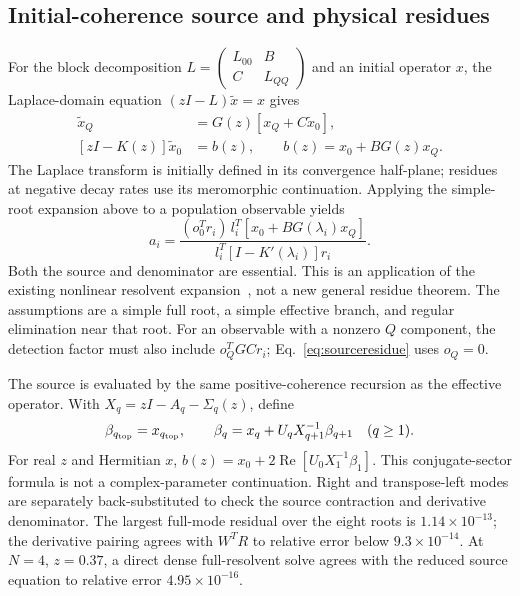 \documentclass[aps,pra,10pt,onecolumn,superscriptaddress,amsmath,amssymb]{revtex4-2}
\begin{document}
\subsection{Initial-coherence source and physical residues}
For the block decomposition $L=\left(\begin{smallmatrix}L_{00}&B\\C&L_{QQ}\end{smallmatrix}\right)$ and an initial operator $x$, the Laplace-domain equation $(zI-L)\widetilde x=x$ gives
\begin{align}
 \widetilde x_Q&=G(z)[x_Q+C\widetilde x_0],\\
 [zI-K(z)]\widetilde x_0&=b(z),\qquad b(z)=x_0+BG(z)x_Q.
\end{align}
The Laplace transform is initially defined in its convergence half-plane; residues at negative decay rates use its meromorphic continuation. Applying the simple-root expansion above to a population observable yields
\begin{equation}
 a_i=\frac{(o_0^Tr_i)\,l_i^T[x_0+BG(\lambda_i)x_Q]}
 {l_i^T[I-K'(\lambda_i)]r_i}.
 \label{eq:sourceresidue}
\end{equation}
Both the source and denominator are essential. This is an application of the existing nonlinear resolvent expansion~\cite{GuttelTisseur2017,FSElimination2020}, not a new general residue theorem. The assumptions are a simple full root, a simple effective branch, and regular elimination near that root. For an observable with a nonzero $Q$ component, the detection factor must also include $o_Q^TGCr_i$; Eq.~\eqref{eq:sourceresidue} uses $o_Q=0$.

The source is evaluated by the same positive-coherence recursion as the effective operator. With $X_q=zI-A_q-\Sigma_q(z)$, define
\begin{equation}
 \beta_{q_{\rm top}}=x_{q_{\rm top}},\qquad
 \beta_q=x_q+U_qX_{q+1}^{-1}\beta_{q+1}\quad(q\ge1).
\end{equation}
For real $z$ and Hermitian $x$, $b(z)=x_0+2\operatorname{Re}[U_0X_1^{-1}\beta_1]$. This conjugate-sector formula is not a complex-parameter continuation. Right and transpose-left modes are separately back-substituted to check the source contraction and derivative denominator. The largest full-mode residual over the eight roots is $1.14\times10^{-13}$; the derivative pairing agrees with $W^TR$ to relative error below $9.3\times10^{-14}$. At $N=4$, $z=0.37$, a direct dense full-resolvent solve agrees with the reduced source equation to relative error $4.95\times10^{-16}$.
\end{document}
